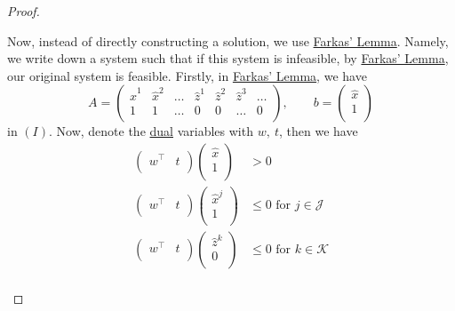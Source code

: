 \begin{proof}
\begin{enumerate}
		      Now, instead of directly constructing a solution, we use \hyperref[lma:Farkas-lemma]{Farkas' Lemma}. Namely, we write down a system such that
		      if this system is infeasible, by \hyperref[lma:Farkas-lemma]{Farkas' Lemma}, our original system is feasible. Firstly, in
		      \hyperref[lma:Farkas-lemma]{Farkas' Lemma}, we have
		      \[
			      A = \begin{pmatrix}
				      \hat{x}^1 & \hat{x}^2 & \ldots & \hat{z}^1 & \hat{z}^2 & \hat{z}^3 & \ldots \\
				      1         & 1         & \ldots & 0         & 0         & \ldots    & 0      \\
			      \end{pmatrix},\qquad b = \begin{pmatrix}
				      \hat{x} \\
				      1       \\
			      \end{pmatrix}
		      \]
		      in \((I)\). Now, denote the \hyperref[def:dual]{dual} variables with \(w,\ t\), then we have
		      \[
			      \begin{split}
				      \begin{pmatrix}
					      w^{\top} & t \\
				      \end{pmatrix}\begin{pmatrix}
					      \hat{x} \\
					      1       \\
				      \end{pmatrix}&>0\\
				      \begin{pmatrix}
					      w^{\top} & t \\
				      \end{pmatrix}\begin{pmatrix}
					      \hat{x}^j \\
					      1         \\
				      \end{pmatrix}&\leq 0 \text{ for }j\in\mathcal{J}\\
				      \begin{pmatrix}
					      w^{\top} & t \\
				      \end{pmatrix}\begin{pmatrix}
					      \hat{z}^k \\
					      0         \\
				      \end{pmatrix}&\leq 0 \text{ for }k\in\mathcal{K}\\

\end{split}\]
\end{enumerate}
\end{proof}
